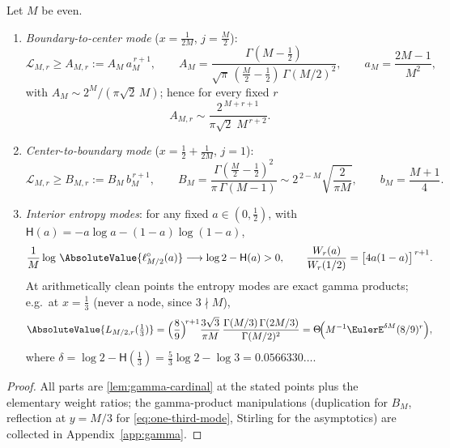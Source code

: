 \documentclass[11pt,oneside]{article}
\numberwithin{equation}{section}
\theoremstyle{definition}
\theoremstyle{remark}
\newcommand{\Leb}{\mathscr L}
\newcommand{\Hyp}{\mathsf H}
\begin{document}
\begin{proposition}
\label{prop:modes}
Let $M$ be even.
\begin{enumerate}
\item\emph{Boundary-to-center mode} ($x=\tfrac1{2M}$, $j=\tfrac M2$):
\begin{equation}
 \Leb_{M,r}\ge A_{M,r}:=A_M\,a_M^{\,r+1},
 \qquad
 A_M=\frac{\Gamma(M-\tfrac12)}
 {\sqrt\pi\,(\tfrac M2-\tfrac12)\,\Gamma(M/2)^{2}},
 \qquad
 a_M=\frac{2M-1}{M^{2}},
 \label{eq:A-mode}
\end{equation}
with $A_M\sim2^{M}/(\pi\sqrt2\,M)$; hence for every fixed $r$
\begin{equation}
 A_{M,r}\sim\frac{2^{\,M+r+1}}{\pi\sqrt2\;M^{\,r+2}}.
 \label{eq:A-asymptotic}
\end{equation}
\item\emph{Center-to-boundary mode} ($x=\tfrac12+\tfrac1{2M}$,
$j=1$):
\begin{equation}
 \Leb_{M,r}\ge B_{M,r}:=B_M\,b_M^{\,r+1},
 \qquad
 B_M=\frac{\Gamma(\tfrac M2-\tfrac12)^{2}}{\pi\,\Gamma(M-1)}
 \sim2^{\,2-M}\sqrt{\frac{2}{\pi M}},
 \qquad
 b_M=\frac{M+1}{4}.
 \label{eq:B-mode}
\end{equation}
\item\emph{Interior entropy modes}: for any fixed $a\in(0,\tfrac12)$,
with $\Hyp(a)=-a\log a-(1-a)\log(1-a)$,
\begin{equation}
 \frac1M\log\,\AbsoluteValue{\ell^{\circ}_{M/2}(a)}
 \longrightarrow\log2-\Hyp(a)>0,
 \qquad
 \frac{W_r(a)}{W_r(1/2)}=\bigl[4a(1-a)\bigr]^{\,r+1}.
 \label{eq:entropy-mode}
\end{equation}
At arithmetically clean points the entropy modes are exact gamma
products; e.g.\ at $x=\tfrac13$ (never a node, since $3\nmid M$),
\begin{equation}
 \AbsoluteValue{L_{M/2,r}(\tfrac13)}
 =\Bigl(\frac89\Bigr)^{\!r+1}
 \frac{3\sqrt3}{\pi M}\,
 \frac{\Gamma(M/3)\,\Gamma(2M/3)}{\Gamma(M/2)^{2}}
 =\Theta\!\Bigl(M^{-1}\EulerE^{\delta M}(8/9)^{r}\Bigr),
 \label{eq:one-third-mode}
\end{equation}
where $\delta=\log2-\Hyp(\tfrac13)=\tfrac53\log2-\log3
=0.0566330\ldots$.
\end{enumerate}
\end{proposition}

\begin{proof}
All parts are \cref{lem:gamma-cardinal} at the stated points plus the
elementary weight ratios; the gamma-product manipulations
(duplication for $B_M$, reflection at $y=M/3$ for
\eqref{eq:one-third-mode}, Stirling for the asymptotics) are collected
in Appendix~\ref{app:gamma}.
\end{proof}
\end{document}
